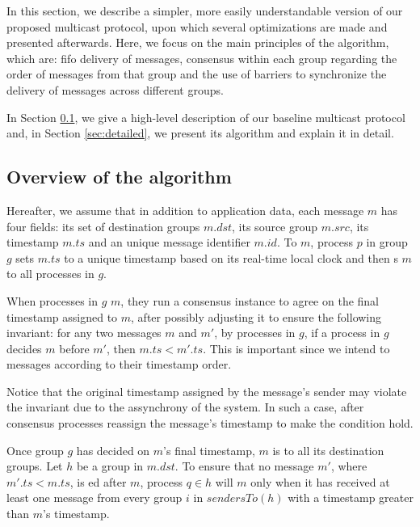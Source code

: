 \documentclass[times, 10pt]{article}
\begin{document}
In this section, we describe a simpler, more easily understandable version of our proposed multicast protocol, upon which several optimizations are made and presented afterwards. Here, we focus on the main principles of the algorithm, which are: fifo delivery of messages, consensus within each group regarding the order of messages from that group and the use of barriers to synchronize the delivery of messages across different groups.

In Section \ref{sec:overview}, we give a high-level description of our baseline multicast protocol and, in Section \ref{sec:detailed}, we present its algorithm and explain it in detail.


\subsection{Overview of the algorithm}
\label{sec:overview}

Hereafter, we assume that in addition to application data, each message $m$ has four fields: its set of destination groups $m.dst$, its source group $m.src$, its timestamp $m.ts$ and an unique message identifier $m.id$. To \amcast{} $m$, process $p$ in group $g$ sets $m.ts$ to a unique timestamp based on its real-time local clock and then \rmcast{}s $m$ to all processes in $g$.

When processes in $g$ \rmdel{} $m$, they run a consensus instance to agree on the final timestamp assigned to $m$, after possibly adjusting it to ensure the following invariant: for any two messages $m$ and $m'$, \amcast{} by processes in $g$, if a process in $g$ decides $m$ before $m'$, then $m.ts < m'.ts$. 
This is important since we intend to \amdel{} messages according to their timestamp order.

Notice that the original timestamp assigned by the message's sender may violate the invariant due to the assynchrony of the system. In such a case, after consensus processes reassign the message's timestamp to make the condition hold.

Once group $g$ has decided on $m$'s final timestamp, $m$ is \rmcast{} to all its destination groups. Let $h$ be a group in $m.dst$. To ensure that no message $m'$, where $m'.ts < m.ts$, is \amdel{}ed after $m$, process $q \in h$ will \amdel{} $m$ only when it has received at least one message from every group $i$ in $sendersTo(h)$ with a timestamp greater than $m$'s timestamp.
\end{document}
